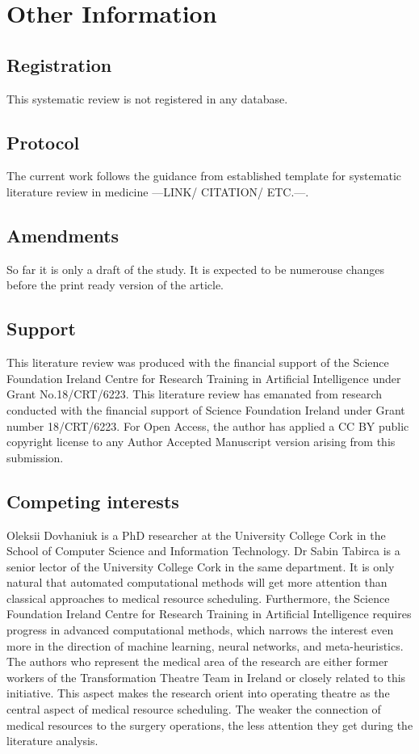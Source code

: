 \chapter{Other Information}
\label{chapterlabel4}

\section{Registration}
    This systematic review is not registered in any database.

\section{Protocol}
    The current work follows the guidance from established template for systematic literature review in medicine ---LINK/ CITATION/ ETC.---.


\section{Amendments}
    So far it is only a draft of the study. It is expected to be numerouse changes before the print ready version of the article.


\section{Support}
    This literature review was produced with the financial support of the Science Foundation Ireland Centre for Research Training in Artificial Intelligence under Grant No.18/CRT/6223. This literature review has emanated from research conducted with the financial support of Science Foundation Ireland under Grant number 18/CRT/6223. For Open Access, the author has applied a CC BY public copyright license to any Author Accepted Manuscript version arising from this submission.

\section{Competing interests}
    Oleksii Dovhaniuk is a PhD researcher at the University College Cork in the School of Computer Science and Information Technology. Dr Sabin Tabirca is a senior lector of the University College Cork in the same department. It is only natural that automated computational methods will get more attention than classical approaches to medical resource scheduling. Furthermore, the Science Foundation Ireland Centre for Research Training in Artificial Intelligence requires progress in advanced computational methods, which narrows the interest even more in the direction of machine learning, neural networks, and meta-heuristics. The authors who represent the medical area of the research are either former workers of the Transformation Theatre Team in Ireland or closely related to this initiative. This aspect makes the research orient into operating theatre as the central aspect of medical resource scheduling. The weaker the connection of medical resources to the surgery operations, the less attention they get during the literature analysis.


